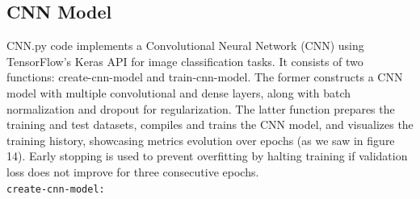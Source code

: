 \documentclass{article}
\newcommand{\code}[1]{\colorbox{light-gray}{\texttt{#1}}}
\begin{document}
\subsection{CNN Model}
CNN.py code implements a Convolutional Neural Network (CNN) using TensorFlow's Keras API for image classification tasks. It consists of two functions: create-cnn-model and train-cnn-model. The former constructs a CNN model with multiple convolutional and dense layers, along with batch normalization and dropout for regularization. The latter function prepares the training and test datasets, compiles and trains the CNN model, and visualizes the training history, showcasing metrics evolution over epochs (as we saw in figure 14). Early stopping is used to prevent overfitting by halting training if validation loss does not improve for three consecutive epochs.\\\newline
\code{create-cnn-model:}
\end{document}
